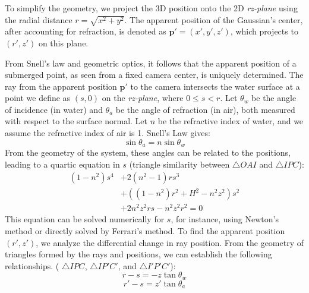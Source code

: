 To simplify the geometry, we project the 3D position onto the 2D \textit{rz-plane} using the radial distance $r = \sqrt{x^2 + y^2}$. 
The apparent position of the Gaussian's center, after accounting for refraction, is denoted as $\bm{p'} = (x', y', z')$, which projects to $(r', z')$ on this plane.

From Snell's law and geometric optics, it follows that the apparent position of a submerged point, as seen from a fixed camera center, is uniquely determined\parencite{nassar1994_ApparentDepth,Missailidis2025_apparentDepth-leading}.
The ray from the apparent position $\bm{p'}$ to the camera intersects the water surface at a point we define as $(s, 0)$ on the \textit{rz-plane}, where $0 \leq s < r$.
Let $\theta_w$ be the angle of incidence (in water) and $\theta_a$ be the angle of refraction (in air), both measured with respect to the surface normal. 
Let $n$ be the refractive index of water, and we assume the refractive index of air is 1. 
Snell's Law gives:
\begin{equation}\label{eq:snell}
  \sin \theta_a = n \sin \theta_w
\end{equation}
From the geometry of the system, these angles can be related to the positions, leading to a quartic equation in $s$
(triangle similarity between $\triangle OAI$ and $\triangle IPC$):
\begin{equation}\label{eq:quartic-s}
\begin{split}
  (1-n^2)s^4 &+ 2(n^2-1)rs^3 \\
             &+ ((1-n^2)r^2 + H^2 - n^2 z^2)s^2 \\ %
             &+ 2n^2z^2rs - n^2z^2r^2 = 0
\end{split}
\end{equation}
This equation can be solved numerically for $s$, for instance, using Newton's method or directly solved by Ferrari's method. 
To find the apparent position $(r', z')$, we analyze the differential change in ray position. 
From the geometry of triangles formed by the rays and positions, we can establish the following relationships.
( $\triangle IPC$, $\triangle IP'C'$, and $\triangle I'P'C'$):
\begin{equation}\label{eq:r-s}
  r - s = -z \tan \theta_w
\end{equation}
\begin{equation}\label{eq:triangle-IP'C'}
  r' - s = z' \tan \theta_a
\end{equation}
